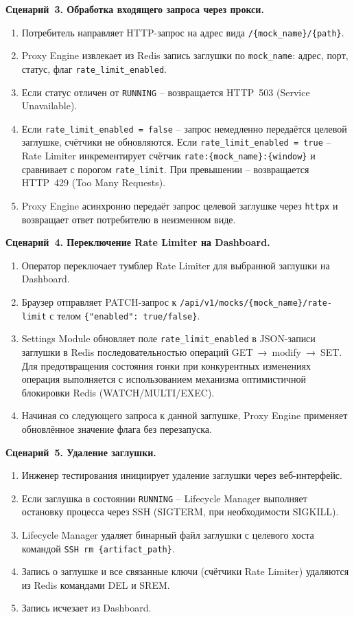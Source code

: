\textbf{Сценарий~3. Обработка входящего запроса через прокси.}

\begin{enumerate}
\item Потребитель направляет HTTP-запрос на адрес вида \texttt{/\{mock\_name\}/\{path\}}.
\item Proxy Engine извлекает из Redis запись заглушки по \texttt{mock\_name}: адрес, порт, статус, флаг \texttt{rate\_limit\_enabled}.
\item Если статус отличен от \texttt{RUNNING} -- возвращается HTTP~503 (Service Unavailable).
\item Если \texttt{rate\_limit\_enabled = false} -- запрос немедленно передаётся целевой заглушке, счётчики не обновляются. Если \texttt{rate\_limit\_enabled = true} -- Rate Limiter инкрементирует счётчик \texttt{rate:\{mock\_name\}:\{window\}} и сравнивает с порогом \texttt{rate\_limit}. При превышении -- возвращается HTTP~429 (Too Many Requests).
\item Proxy Engine асинхронно передаёт запрос целевой заглушке через \texttt{httpx} и возвращает ответ потребителю в неизменном виде.
\end{enumerate}

\textbf{Сценарий~4. Переключение Rate Limiter на Dashboard.}

\begin{enumerate}
\item Оператор переключает тумблер Rate Limiter для выбранной заглушки на Dashboard.
\item Браузер отправляет PATCH-запрос к \texttt{/api/v1/mocks/\{mock\_name\}/rate-limit} с телом \texttt{\{"enabled": true/false\}}.
\item Settings Module обновляет поле \texttt{rate\_limit\_enabled} в JSON-записи заглушки в Redis последовательностью операций GET~→~modify~→~SET. Для предотвращения состояния гонки при конкурентных изменениях операция выполняется с использованием механизма оптимистичной блокировки Redis (WATCH/MULTI/EXEC).
\item Начиная со следующего запроса к данной заглушке, Proxy Engine применяет обновлённое значение флага без перезапуска.
\end{enumerate}

\textbf{Сценарий~5. Удаление заглушки.}

\begin{enumerate}
\item Инженер тестирования инициирует удаление заглушки через веб-интерфейс.
\item Если заглушка в состоянии \texttt{RUNNING} -- Lifecycle Manager выполняет остановку процесса через SSH (SIGTERM, при необходимости SIGKILL).
\item Lifecycle Manager удаляет бинарный файл заглушки с целевого хоста командой \texttt{SSH rm \{artifact\_path\}}.
\item Запись о заглушке и все связанные ключи (счётчики Rate Limiter) удаляются из Redis командами DEL и SREM.
\item Запись исчезает из Dashboard.
\end{enumerate}

